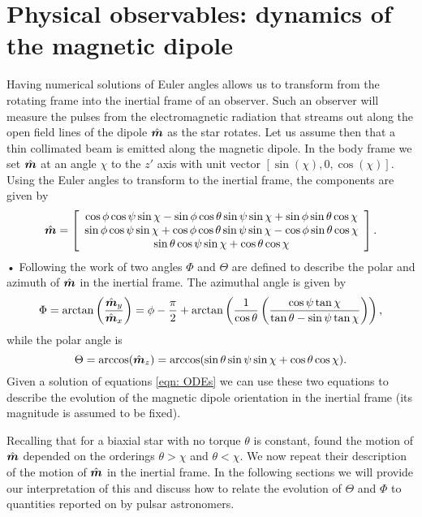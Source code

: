 \documentclass[../full_thesis/full_thesis.tex]{subfiles}
\begin{document}
\section{Physical observables: dynamics of the magnetic dipole} Having
numerical solutions of Euler angles allows us to transform from the rotating
frame into the inertial frame of an observer. Such an observer will measure the
pulses from the electromagnetic radiation that streams out along the open field
lines of the dipole $\hat{\boldsymbol{m}}$ as the star rotates. Let us assume then that a
thin collimated beam is emitted along the magnetic dipole. In the body frame we
set $\hat{\boldsymbol{m}}$ at an angle $\chi$ to the $z'$ axis with unit vector $[\sin(\chi), 0,
\cos(\chi)]$. Using the Euler angles to transform to the inertial frame, the
components are given by
\begin{equation}
\hat{\boldsymbol{m}} =
\left[\begin{array}{c}
\cos\phi\cos\psi\sin\chi - \sin\phi \cos \theta \sin \psi \sin \chi
+ \sin \phi \sin \theta \cos \chi \\
\sin\phi\cos\psi\sin\chi + \cos\phi \cos \theta \sin \psi \sin \chi
- \cos \phi \sin \theta \cos \chi \\
\sin\theta \cos\psi \sin\chi + \cos\theta \cos \chi
\end{array}\right].
\label{eqn: m inertial}
\end{equation}•
Following the work of \citet{Jones2001} two angles $\Phi$ and $\Theta$ are
defined to describe the polar and azimuth of $\hat{\boldsymbol{m}}$ in the inertial frame.
The azimuthal angle is given by
\begin{equation}
    \Phi = \arctan\left(\frac{\hat{\boldsymbol{m}}_{y}}{\hat{\boldsymbol{m}}_{x}}\right) =
\phi - \frac{\pi}{2} + \arctan\left(\frac{1}{\cos\theta}
                       \left(\frac{\cos\psi \tan \chi}{\tan\theta -
                       \sin \psi \tan\chi }\right)\right),
\label{eqn: Phi}
\end{equation}
while the polar angle is
\begin{equation}
\Theta = \arccos(\hat{\boldsymbol{m}}_{z}) = \arccos(\sin \theta \sin \psi \sin \chi + \cos \theta \cos \chi ).
\label{eqn: Theta 2}
\end{equation}
Given a solution of equations \eqref{eqn: ODEs} we can use these two equations
to describe the evolution of the magnetic dipole orientation in the inertial
frame (its magnitude is assumed to be fixed).

Recalling that for a biaxial star with no torque $\theta$ is constant,
\citet{Jones2001} found the motion of $\hat{\boldsymbol{m}}$ depended on the orderings
$\theta > \chi$ and $\theta < \chi$. We now repeat their description of the
motion of $\hat{\boldsymbol{m}}$ in the inertial frame. In the following sections we will provide
our interpretation of this and discuss how to relate the evolution of
$\Theta$ and $\Phi$ to quantities reported on by pulsar astronomers.
\end{document}
